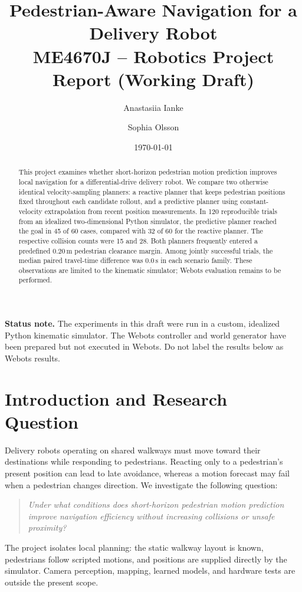 \documentclass[11pt,a4paper]{article}
\title{Pedestrian-Aware Navigation for a Delivery Robot\\
\large ME4670J -- Robotics Project Report (Working Draft)}
\author{Anastasiia Ianke \and Sophia Olsson}
\date{\today}
\begin{document}
\maketitle
\noindent\textbf{Status note.} The experiments in this draft were run in a custom, idealized Python kinematic simulator. The Webots controller and world generator have been prepared but not executed in Webots. Do not label the results below as Webots results.

\begin{abstract}
This project examines whether short-horizon pedestrian motion prediction improves local navigation for a differential-drive delivery robot. We compare two otherwise identical velocity-sampling planners: a reactive planner that keeps pedestrian positions fixed throughout each candidate rollout, and a predictive planner using constant-velocity extrapolation from recent position measurements. In 120 reproducible trials from an idealized two-dimensional Python simulator, the predictive planner reached the goal in 45 of 60 cases, compared with 32 of 60 for the reactive planner. The respective collision counts were 15 and 28. Both planners frequently entered a predefined \(0.20\,\mathrm{m}\) pedestrian clearance margin. Among jointly successful trials, the median paired travel-time difference was \(0.0\,\mathrm{s}\) in each scenario family. These observations are limited to the kinematic simulator; Webots evaluation remains to be performed.
\end{abstract}

\section{Introduction and Research Question}
Delivery robots operating on shared walkways must move toward their destinations while responding to pedestrians. Reacting only to a pedestrian's present position can lead to late avoidance, whereas a motion forecast may fail when a pedestrian changes direction. We investigate the following question:
\begin{quote}
\emph{Under what conditions does short-horizon pedestrian motion prediction improve navigation efficiency without increasing collisions or unsafe proximity?}
\end{quote}
The project isolates local planning: the static walkway layout is known, pedestrians follow scripted motions, and positions are supplied directly by the simulator. Camera perception, mapping, learned models, and hardware tests are outside the present scope.
\end{document}

